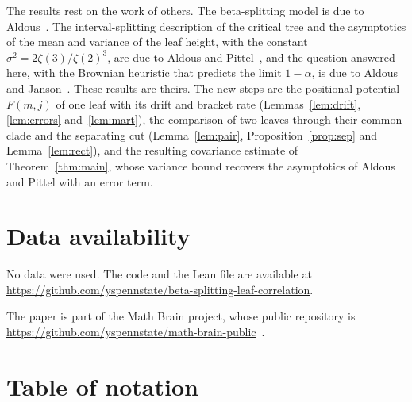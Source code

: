 \documentclass[11pt]{amsart}
\theoremstyle{remark}
\numberwithin{equation}{section}
\begin{document}
The results rest on the work of others. The beta-splitting model is due to Aldous~\cite{Ald96}. The interval-splitting description of the critical tree and the asymptotics of the mean and variance of the leaf height, with the constant $\sigma^2=2\zeta(3)/\zeta(2)^3$, are due to Aldous and Pittel~\cite{AP}, and the question answered here, with the Brownian heuristic that predicts the limit $1-\alpha$, is due to Aldous and Janson~\cite{AJ}. These results are theirs. The new steps are the positional potential $F(m,j)$ of one leaf with its drift and bracket rate (Lemmas~\ref{lem:drift}, \ref{lem:errors} and~\ref{lem:mart}), the comparison of two leaves through their common clade and the separating cut (Lemma~\ref{lem:pair}, Proposition~\ref{prop:sep} and Lemma~\ref{lem:rect}), and the resulting covariance estimate of Theorem~\ref{thm:main}, whose variance bound recovers the asymptotics of Aldous and Pittel with an error term.

\section*{Data availability}
No data were used. The code and the Lean file are available at\\ \url{https://github.com/yspennstate/beta-splitting-leaf-correlation}.

The paper is part of the Math Brain project, whose public repository is \url{https://github.com/yspennstate/math-brain-public}~\cite{MathBrainRepo}.

\appendix
\section{Table of notation}\label{app:notation}
\end{document}
